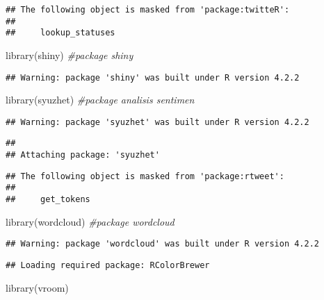 \documentclass[
]{article}
\newenvironment{Shaded}{\begin{snugshade}}{\end{snugshade}}
\newcommand{\CommentTok}[1]{\textcolor[rgb]{0.56,0.35,0.01}{\textit{#1}}}
\newcommand{\FunctionTok}[1]{\textcolor[rgb]{0.00,0.00,0.00}{#1}}
\newcommand{\NormalTok}[1]{#1}
\begin{document}
\begin{verbatim}
## The following object is masked from 'package:twitteR':
## 
##     lookup_statuses
\end{verbatim}

\begin{Shaded}
\begin{Highlighting}[]
\FunctionTok{library}\NormalTok{(shiny) }\CommentTok{\#package shiny}
\end{Highlighting}
\end{Shaded}

\begin{verbatim}
## Warning: package 'shiny' was built under R version 4.2.2
\end{verbatim}

\begin{Shaded}
\begin{Highlighting}[]
\FunctionTok{library}\NormalTok{(syuzhet) }\CommentTok{\#package analisis sentimen}
\end{Highlighting}
\end{Shaded}

\begin{verbatim}
## Warning: package 'syuzhet' was built under R version 4.2.2
\end{verbatim}

\begin{verbatim}
## 
## Attaching package: 'syuzhet'
\end{verbatim}

\begin{verbatim}
## The following object is masked from 'package:rtweet':
## 
##     get_tokens
\end{verbatim}

\begin{Shaded}
\begin{Highlighting}[]
\FunctionTok{library}\NormalTok{(wordcloud) }\CommentTok{\#package wordcloud}
\end{Highlighting}
\end{Shaded}

\begin{verbatim}
## Warning: package 'wordcloud' was built under R version 4.2.2
\end{verbatim}

\begin{verbatim}
## Loading required package: RColorBrewer
\end{verbatim}

\begin{Shaded}
\begin{Highlighting}[]
\FunctionTok{library}\NormalTok{(vroom)}
\end{Highlighting}
\end{Shaded}
\end{document}
